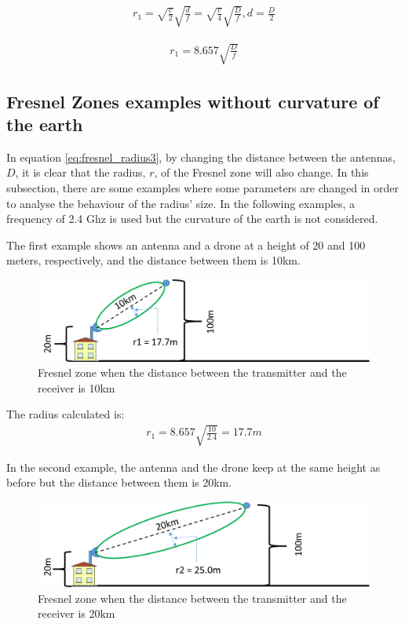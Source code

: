 \begin{align}
r_1 = \sqrt{\frac{c}{2}}\sqrt{\frac{d}{f}} = \sqrt{\frac{c}{4}}\sqrt{\frac{D}{f}}, d=\frac{D}{2} \label{eq:fresnel_radius2}
\end{align}

\begin{align}
r_1 = 8.657 \sqrt{\frac{D}{f}} \label{eq:fresnel_radius3}
\end{align}

\subsection{Fresnel Zones examples without curvature of the earth}
In equation \ref{eq:fresnel_radius3}, by changing the distance between the antennas, $D$, it is clear that the radius, $r$, of the Fresnel zone will also change. In this subsection, there are some examples where some parameters are changed in order to analyse the behaviour of the radius' size. In the following examples, a frequency of 2.4 Ghz is used but the curvature of the earth is not considered. 

The first example shows an antenna and a drone at a height of 20 and 100 meters, respectively, and the distance between them is 10km.

\begin{figure}[H]
	\centering
	\includegraphics[scale=0.50]{figures/fresnel_10km.png}
	\caption{Fresnel zone when the distance between the transmitter and the receiver is 10km}
	\label{fig:fresnel_zones_10km}
\end{figure}  

The radius calculated is:
\begin{align*}
r_1 = 8.657 \sqrt{\frac{10}{2.4}} = 17.7m
\end{align*}

In the second example, the antenna and the drone keep at the same height as before but the distance between them is 20km.

\begin{figure}[H]
	\centering
	\includegraphics[scale=0.50]{figures/fresnel_20km.png}
	\caption{Fresnel zone when the distance between the transmitter and the receiver is 20km}
	\label{fig:fresnel_zones_20km}
\end{figure}  

